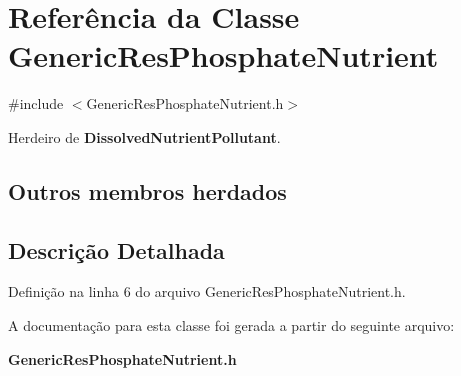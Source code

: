 \section{Referência da Classe Generic\+Res\+Phosphate\+Nutrient}
\label{class_generic_res_phosphate_nutrient}


{\ttfamily \#include $<$Generic\+Res\+Phosphate\+Nutrient.\+h$>$}



Herdeiro de {\bf Dissolved\+Nutrient\+Pollutant}.

\subsection*{Outros membros herdados}


\subsection{Descrição Detalhada}


Definição na linha 6 do arquivo Generic\+Res\+Phosphate\+Nutrient.\+h.



A documentação para esta classe foi gerada a partir do seguinte arquivo\+:\begin{DoxyCompactItemize}
\item 
{\bf Generic\+Res\+Phosphate\+Nutrient.\+h}\end{DoxyCompactItemize}
